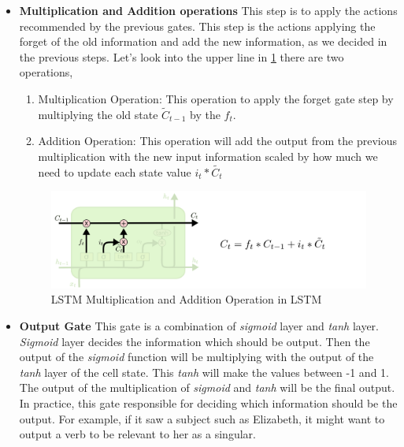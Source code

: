 \begin{itemize}
\item \textbf{Multiplication and Addition operations} This step is to apply the actions recommended by the previous gates. This step is the actions applying the forget of the old information and add the new information, as we decided in the previous steps. Let's look into the upper line in \ref{fig:LSTM-pointwise-operations} there are two operations, 
  \begin{enumerate}
  \item Multiplication Operation: This operation to apply the forget gate step by multiplying the old state $\tilde{C}_{t-1} $ by the $f_t$.
  \item Addition Operation: This operation will add the output from the previous multiplication with the new input information scaled by how much we need to update each state value $i_t * \tilde{C_t}$
    \end{enumerate}

    \begin{figure}[h!]
    \centering \includegraphics[width=\textwidth]{./Figures/Ch_2_Background/LSTM-pointwise-operations.png}
        \caption{LSTM Multiplication and Addition Operation in LSTM \cite{colah}}
        \label{fig:LSTM-pointwise-operations}
      \end{figure}

      
      
    \item \textbf{Output Gate} This gate is a combination of \textit{sigmoid} layer and \textit{tanh} layer. \textit{Sigmoid} layer decides the information which should be output. Then the output of the  \textit{sigmoid} function will be multiplying with the output of the \textit{tanh} layer of the cell state. This \textit{tanh} will make the values between -1 and 1. The output of the multiplication of \textit{sigmoid} and \textit{tanh} will be the final output. In practice, this gate responsible for deciding which information should be the output. For example, if it saw a subject such as Elizabeth, it might want to output a verb to be relevant to her as a singular.


\end{itemize}
